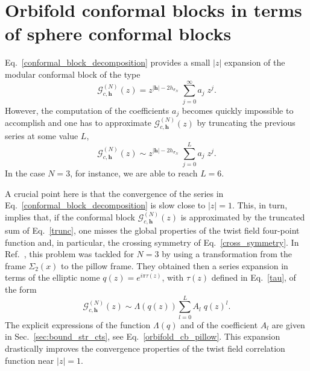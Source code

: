 \documentclass[a4paper,11pt]{article}
\begin{document}
\section{Orbifold conformal blocks in terms of sphere conformal blocks}\label{sec:sphere_conf_blocks}
Eq.~\eqref{conformal_block_decomposition} provides a small $|z|$ expansion of the modular conformal block of the type
\begin{equation}
\mathcal{G}_{c,\boldsymbol{h}}^{(N)}(z) =z^{|\boldsymbol{h}|-2h_{\sigma_N}} \;\sum_{j=0}^{\infty} a_j \; z^j.
\end{equation}
However, the computation of the coefficients $a_j$ becomes quickly impossible to accomplish and one has to approximate $\mathcal{G}_{c,\boldsymbol{h}}^{(N)}(z)$ by truncating the previous series at some value $L$,
\begin{equation}\label{trunc}
\mathcal{G}_{c,\boldsymbol{h}}^{(N)}(z) \sim z^{|\boldsymbol{h}|-2h_{\sigma_N}} \;\sum_{j=0}^{L} a_j \; z^j.
\end{equation}
In the case $N=3$, for instance, we are able to reach $L=6$.

A crucial point here is that the convergence of the series in Eq.~\eqref{conformal_block_decomposition} is slow close to  $|z|=1$. This, in turn, implies that, if the conformal block $\mathcal{G}_{c,\boldsymbol{h}}^{(N)}(z)$ is approximated by the truncated sum of Eq.~\eqref{trunc}, one misses the global properties of the twist field four-point function and, in particular, the crossing symmetry of Eq.~\eqref{cross_symmetry}. 
In Ref.~\cite{Collier}, this problem was tackled for $N=3$ by using a transformation from the frame $\Sigma_2(x)$ to the pillow frame. They  obtained then a series expansion in terms of the elliptic nome $q(z)=e^{i\pi\tau(z)}$, with $\tau(z)$ defined in Eq.~\eqref{tau}, 
of the form
\begin{equation}\label{collierap}
\mathcal{G}_{c,\boldsymbol{h}}^{(N)}(z)\sim\Lambda(q(z))\sum_{l=0}^{L} A_l \; q(z)^l.
\end{equation}
The explicit expressions of the function $\Lambda(q)$ and of the coefficient $A_l$ are 
given in Sec.~\ref{sec:bound_str_cts}, see Eq.~\eqref{orbifold_cb_pillow}. 
This expansion drastically improves the convergence properties of the twist field 
correlation function near $|z|=1$.
\end{document}
